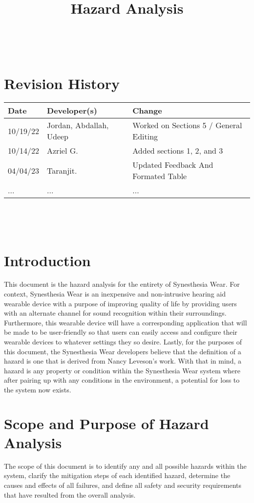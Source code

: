 \documentclass{article}
\title{Hazard Analysis\\\progname}
\author{\authname}
\date{}
\begin{document}
\maketitle
\thispagestyle{empty}

~\newpage

\section*{Revision History}
\begin{tabularx}{\textwidth}{llX}
\toprule
\textbf{Date} & \textbf{Developer(s)} & \textbf{Change}\\
\midrule
10/19/22 & Jordan, Abdallah, Udeep & Worked on Sections 5 / General Editing\\
10/14/22 & Azriel G. & Added sections 1, 2, and 3\\
04/04/23 & Taranjit. & Updated Feedback And Formated Table\\
... & ... & ...\\
\bottomrule
	\end{tabularx}

~\newpage

\tableofcontents

~\newpage


\section{Introduction}
This document is the hazard analysis for the entirety of Synesthesia Wear.
For context, Synesthesia Wear is an inexpensive and non-intrusive hearing aid 
wearable device with a purpose of improving quality of life by providing users with 
an alternate channel for sound recognition within their surroundings. Furthermore, 
this wearable device will have a corresponding application that will be made to be 
user-friendly so that users can easily access and configure their wearable devices to 
whatever settings they so desire. Lastly, for the purposes of this document, the 
Synesthesia Wear developers believe that the definition of a hazard is one that is 
derived from Nancy Leveson's work. With that in mind, a hazard is any property or 
condition within the Synesthesia Wear system where after pairing up with any 
conditions in the environment, a potential for loss to the system now exists.

\section{Scope and Purpose of Hazard Analysis}
The scope of this document is to identify any and all possible hazards within 
the system, clarify the mitigation steps of each identified hazard, determine 
the causes and effects of all failures, and define all safety and security requirements 
that have resulted from the overall analysis.
\end{document}
